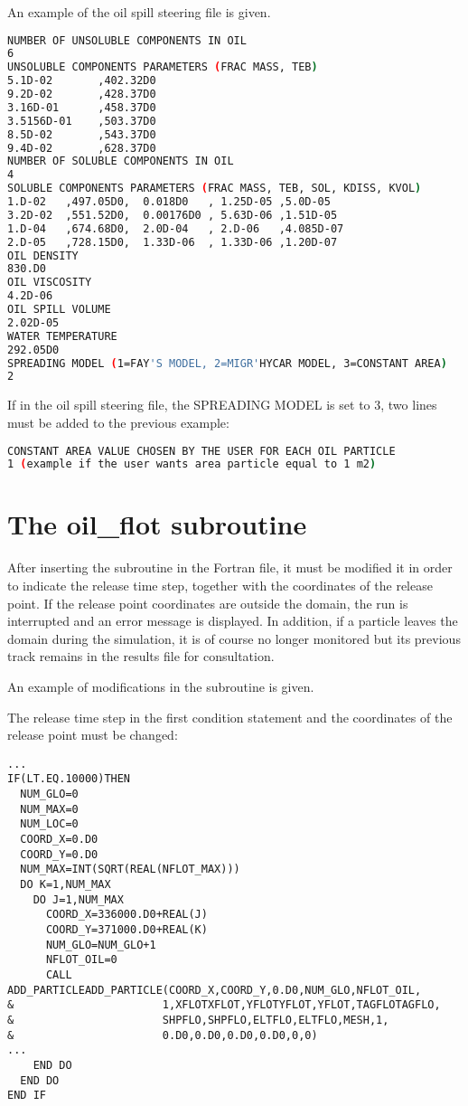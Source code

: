 An example of the oil spill steering file is given.

\begin{lstlisting}[language=bash]
NUMBER OF UNSOLUBLE COMPONENTS IN OIL
6
UNSOLUBLE COMPONENTS PARAMETERS (FRAC MASS, TEB)
5.1D-02       ,402.32D0
9.2D-02       ,428.37D0
3.16D-01      ,458.37D0
3.5156D-01    ,503.37D0
8.5D-02       ,543.37D0
9.4D-02       ,628.37D0
NUMBER OF SOLUBLE COMPONENTS IN OIL
4
SOLUBLE COMPONENTS PARAMETERS (FRAC MASS, TEB, SOL, KDISS, KVOL)
1.D-02   ,497.05D0,  0.018D0   , 1.25D-05 ,5.0D-05
3.2D-02  ,551.52D0,  0.00176D0 , 5.63D-06 ,1.51D-05
1.D-04   ,674.68D0,  2.0D-04   , 2.D-06   ,4.085D-07
2.D-05   ,728.15D0,  1.33D-06  , 1.33D-06 ,1.20D-07
OIL DENSITY
830.D0
OIL VISCOSITY
4.2D-06
OIL SPILL VOLUME
2.02D-05
WATER TEMPERATURE
292.05D0
SPREADING MODEL (1=FAY'S MODEL, 2=MIGR'HYCAR MODEL, 3=CONSTANT AREA)
2
\end{lstlisting}

If in the oil spill steering file, the SPREADING MODEL is set to 3, two lines
must be added to the previous example:

\begin{lstlisting}[language=bash]
CONSTANT AREA VALUE CHOSEN BY THE USER FOR EACH OIL PARTICLE
1 (example if the user wants area particle equal to 1 m2)
\end{lstlisting}


\section{The oil\_flot subroutine}

After inserting the  subroutine in the Fortran file, it must
be modified it in order to indicate the release time step, together with the
coordinates of the release point. If the release point coordinates are outside
the domain, the run is interrupted and an error message is displayed. In
addition, if a particle leaves the domain during the simulation, it is of
course no longer monitored but its previous track remains in the results file
for consultation.

An example of modifications in the  subroutine is given.

The release time step in the first condition statement and the coordinates of
the release point must be changed:

\begin{lstlisting}[language=TelFortran]
...
IF(LT.EQ.10000)THEN
  NUM_GLO=0
  NUM_MAX=0
  NUM_LOC=0
  COORD_X=0.D0
  COORD_Y=0.D0
  NUM_MAX=INT(SQRT(REAL(NFLOT_MAX)))
  DO K=1,NUM_MAX
    DO J=1,NUM_MAX
      COORD_X=336000.D0+REAL(J)
      COORD_Y=371000.D0+REAL(K)
      NUM_GLO=NUM_GLO+1
      NFLOT_OIL=0
      CALL ADD_PARTICLEADD_PARTICLE(COORD_X,COORD_Y,0.D0,NUM_GLO,NFLOT_OIL,
&                       1,XFLOTXFLOT,YFLOTYFLOT,YFLOT,TAGFLOTAGFLO,
&                       SHPFLO,SHPFLO,ELTFLO,ELTFLO,MESH,1,
&                       0.D0,0.D0,0.D0,0.D0,0,0)
...
    END DO
  END DO
END IF
\end{lstlisting}


